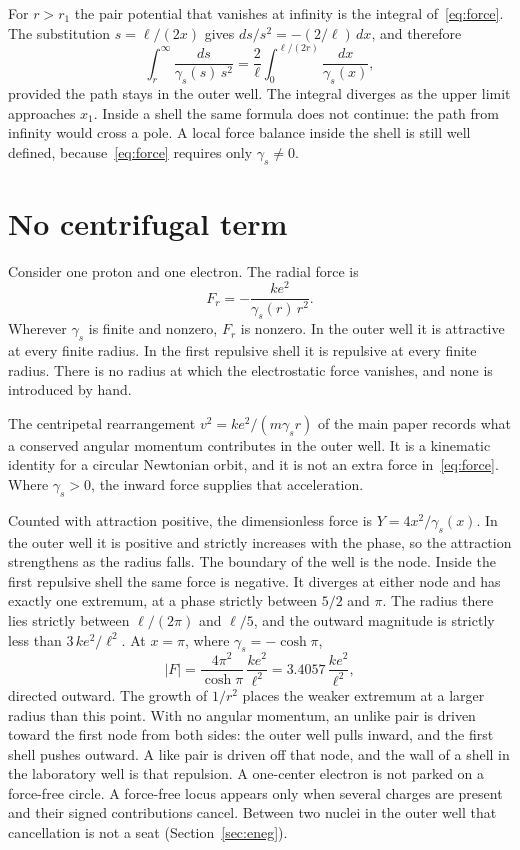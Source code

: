 \documentclass[a4paper]{article}
\begin{document}
For \(r>r_1\) the pair potential that vanishes at infinity is the integral of~\eqref{eq:force}. The substitution \(s=\ell/(2x)\) gives \(ds/s^{2}=-(2/\ell)\,dx\), and therefore
\begin{equation}
\label{eq:potential}
\int_r^{\infty}\frac{ds}{\gamma_s(s)\,s^{2}}
  =\frac{2}{\ell}\int_0^{\ell/(2r)}\frac{dx}{\gamma_s(x)},
\end{equation}
provided the path stays in the outer well. The integral diverges as the upper limit approaches \(x_1\). Inside a shell the same formula does not continue: the path from infinity would cross a pole. A local force balance inside the shell is still well defined, because~\eqref{eq:force} requires only \(\gamma_s\neq 0\).

\section{No centrifugal term}
\label{sec:nocent}

Consider one proton and one electron. The radial force is
\[
F_r=-\frac{k e^{2}}{\gamma_s(r)\,r^{2}}.
\]
Wherever \(\gamma_s\) is finite and nonzero, \(F_r\) is nonzero. In the outer well it is attractive at every finite radius. In the first repulsive shell it is repulsive at every finite radius. There is no radius at which the electrostatic force vanishes, and none is introduced by hand.

The centripetal rearrangement \(v^{2}=k e^{2}/(m\gamma_s r)\) of the main paper records what a conserved angular momentum contributes in the outer well. It is a kinematic identity for a circular Newtonian orbit, and it is not an extra force in~\eqref{eq:force}. Where \(\gamma_s>0\), the inward force supplies that acceleration.

Counted with attraction positive, the dimensionless force is \(Y=4x^{2}/\gamma_s(x)\). In the outer well it is positive and strictly increases with the phase, so the attraction strengthens as the radius falls. The boundary of the well is the node. Inside the first repulsive shell the same force is negative. It diverges at either node and has exactly one extremum, at a phase strictly between \(5/2\) and \(\pi\). The radius there lies strictly between \(\ell/(2\pi)\) and \(\ell/5\), and the outward magnitude is strictly less than \(3\,k e^{2}/\ell^{2}\). At \(x=\pi\), where \(\gamma_s=-\cosh\pi\),
\begin{equation}
\label{eq:plateau}
\bigl|F\bigr|
  =\frac{4\pi^{2}}{\cosh\pi}\,\frac{k e^{2}}{\ell^{2}}
  =3.4057\,\frac{k e^{2}}{\ell^{2}},
\end{equation}
directed outward. The growth of \(1/r^{2}\) places the weaker extremum at a larger radius than this point. With no angular momentum, an unlike pair is driven toward the first node from both sides: the outer well pulls inward, and the first shell pushes outward. A like pair is driven off that node, and the wall of a shell in the laboratory well is that repulsion. A one-center electron is not parked on a force-free circle. A force-free locus appears only when several charges are present and their signed contributions cancel. Between two nuclei in the outer well that cancellation is not a seat (Section~\ref{sec:eneg}).
\end{document}
